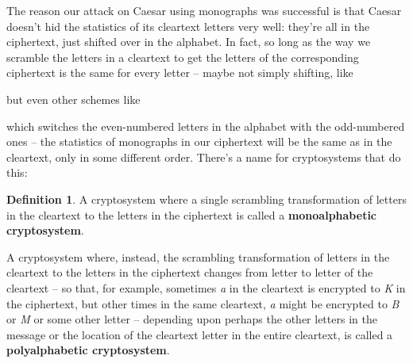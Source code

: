 \documentclass[12pt,letterpaper]{amsbook}
\theoremstyle{definition}
\newtheorem{definition}[theorem]{Definition}
\theoremstyle{remark}
\numberwithin{figure}{section}
\numberwithin{exercise}{chapter}
\numberwithin{section}{chapter}
\numberwithin{equation}{section}
\numberwithin{table}{subsection}
\begin{document}
The reason our attack on Caesar using monographs was successful is that Caesar
doesn't hid the statistics of its cleartext letters very well: they're all in
the ciphertext, just shifted over in the alphabet.  In fact, so long as the
way we scramble the letters in a cleartext to get the letters of the
corresponding ciphertext is the same for every letter -- maybe not simply
shifting, like
\begin{tcolorbox}[colback=yellow!5!white,colframe=yellow!75!black]
\hskip-2mm
\end{tcolorbox}
\noindent but even other schemes like
\begin{tcolorbox}[colback=yellow!5!white,colframe=yellow!75!black]
\hskip-2mm
\end{tcolorbox}
\noindent which switches the even-numbered letters in the alphabet with the
odd-numbered ones -- the statistics of monographs in our ciphertext will be
the same as in the cleartext, only in some different order.  There's a name
for cryptosystems that do this:
\begin{definition}\label{def:monoalphabeticcryptosystem}\label{def:polyalphabeticcryptosystem}
A cryptosystem where a single scrambling transformation of letters in the
cleartext to the letters in the ciphertext is called a
\textbf{monoalphabetic cryptosystem}.

A cryptosystem where, instead, the scrambling transformation of letters in the
cleartext to the letters in the ciphertext changes from letter to letter of
the cleartext -- so that, for example, sometimes \textit{a} in the cleartext
is encrypted to \textit{K} in the ciphertext, but other times in the same
cleartext, \textit{a} might be encrypted to \textit{B} or \textit{M} or some
other letter -- depending upon perhaps the other letters in the message or the
location of the cleartext letter in the entire cleartext, is called a
\textbf{polyalphabetic cryptosystem}.
\end{definition}
\end{document}

